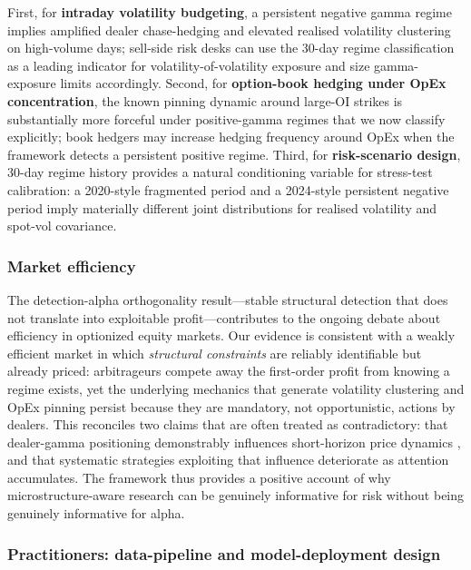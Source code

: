 First, for \textbf{intraday volatility budgeting}, a persistent negative
gamma regime implies amplified dealer chase-hedging and elevated realised
volatility clustering on high-volume days; sell-side risk desks can use
the 30-day regime classification as a leading indicator for
volatility-of-volatility exposure and size gamma-exposure limits
accordingly. Second, for \textbf{option-book hedging under OpEx
concentration}, the known pinning dynamic around large-OI strikes
\citep{ni2005stock} is substantially more forceful under positive-gamma
regimes that we now classify explicitly; book hedgers may increase
hedging frequency around OpEx when the framework detects a persistent
positive regime. Third, for \textbf{risk-scenario design}, 30-day
regime history provides a natural conditioning variable for stress-test
calibration: a 2020-style fragmented period and a 2024-style persistent
negative period imply materially different joint distributions for
realised volatility and spot-vol covariance.

\subsubsection{Market efficiency}

The detection-alpha orthogonality result---stable structural detection
that does not translate into exploitable profit---contributes to the
ongoing debate about efficiency in optionized equity markets. Our
evidence is consistent with a weakly efficient market in which
\textit{structural constraints} are reliably identifiable but already
priced: arbitrageurs compete away the first-order profit from knowing a
regime exists, yet the underlying mechanics that generate volatility
clustering and OpEx pinning persist because they are mandatory, not
opportunistic, actions by dealers. This reconciles two claims that are
often treated as contradictory: that dealer-gamma positioning demonstrably
influences short-horizon price dynamics \citep{anderegg2022impact}, and
that systematic strategies exploiting that influence deteriorate as
attention accumulates. The framework thus provides a positive account of
why microstructure-aware research can be genuinely informative for risk
without being genuinely informative for alpha.

\subsubsection{Practitioners: data-pipeline and model-deployment design}

